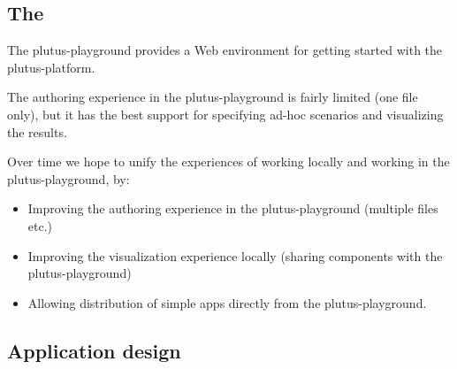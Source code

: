 \documentclass[plutus.tex]{subfiles}
\begin{document}
\subsection{The }
\label{sec:plutus-playground}

The \gls{plutus-playground} provides a Web environment for getting started with the \gls{plutus-platform}.

The authoring experience in the \gls{plutus-playground} is fairly limited (one file only), but it has the best support for specifying ad-hoc scenarios and visualizing the results.

Over time we hope to unify the experiences of working locally and working in the \gls{plutus-playground}, by:
\begin{itemize}
\item Improving the authoring experience in the \gls{plutus-playground} (multiple files etc.)
\item Improving the visualization experience locally (sharing components with the \gls{plutus-playground})
\item Allowing distribution of simple \glspl{app} directly from the \gls{plutus-playground}.
\end{itemize}

\subsection{Application design}

\end{document}
